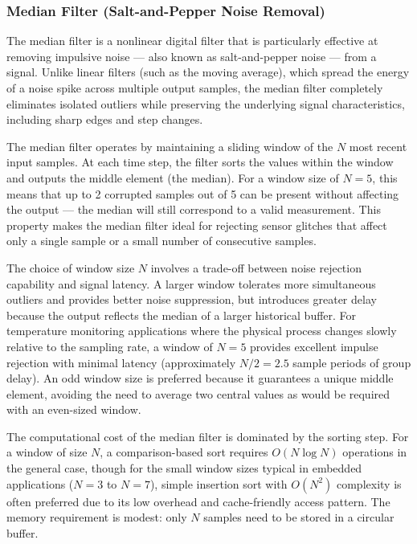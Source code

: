 \subsubsection{Median Filter (Salt-and-Pepper Noise Removal)}

The median filter is a nonlinear digital filter that is particularly effective at removing impulsive noise --- also known as salt-and-pepper noise --- from a signal. Unlike linear filters (such as the moving average), which spread the energy of a noise spike across multiple output samples, the median filter completely eliminates isolated outliers while preserving the underlying signal characteristics, including sharp edges and step changes.

The median filter operates by maintaining a sliding window of the $N$ most recent input samples. At each time step, the filter sorts the values within the window and outputs the middle element (the median). For a window size of $N = 5$, this means that up to 2 corrupted samples out of 5 can be present without affecting the output --- the median will still correspond to a valid measurement. This property makes the median filter ideal for rejecting sensor glitches that affect only a single sample or a small number of consecutive samples.

The choice of window size $N$ involves a trade-off between noise rejection capability and signal latency. A larger window tolerates more simultaneous outliers and provides better noise suppression, but introduces greater delay because the output reflects the median of a larger historical buffer. For temperature monitoring applications where the physical process changes slowly relative to the sampling rate, a window of $N = 5$ provides excellent impulse rejection with minimal latency (approximately $N/2 = 2.5$ sample periods of group delay). An odd window size is preferred because it guarantees a unique middle element, avoiding the need to average two central values as would be required with an even-sized window.

The computational cost of the median filter is dominated by the sorting step. For a window of size $N$, a comparison-based sort requires $O(N \log N)$ operations in the general case, though for the small window sizes typical in embedded applications ($N = 3$ to $N = 7$), simple insertion sort with $O(N^2)$ complexity is often preferred due to its low overhead and cache-friendly access pattern. The memory requirement is modest: only $N$ samples need to be stored in a circular buffer.

